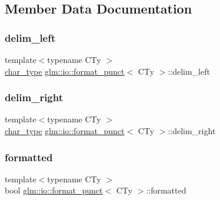 \subsection{Member Data Documentation}
\mbox{\label{classglm_1_1io_1_1format__punct_ab1beed331269a39b06d17d02cf727d7c}} 
\subsubsection{\texorpdfstring{delim\+\_\+left}{delim\_left}}
{\footnotesize\ttfamily template$<$typename C\+Ty $>$ \\
\mbox{\hyperlink{classglm_1_1io_1_1format__punct_ae94c42484a4c5258ad7b2f0f029efdf3}{char\+\_\+type}} \mbox{\hyperlink{classglm_1_1io_1_1format__punct}{glm\+::io\+::format\+\_\+punct}}$<$ C\+Ty $>$\+::delim\+\_\+left}

\mbox{\label{classglm_1_1io_1_1format__punct_a62fb1280404360463ec5af7144aa0949}} 
\subsubsection{\texorpdfstring{delim\+\_\+right}{delim\_right}}
{\footnotesize\ttfamily template$<$typename C\+Ty $>$ \\
\mbox{\hyperlink{classglm_1_1io_1_1format__punct_ae94c42484a4c5258ad7b2f0f029efdf3}{char\+\_\+type}} \mbox{\hyperlink{classglm_1_1io_1_1format__punct}{glm\+::io\+::format\+\_\+punct}}$<$ C\+Ty $>$\+::delim\+\_\+right}

\mbox{\label{classglm_1_1io_1_1format__punct_ab28088e6eef03fe4222fa8a5dd95288e}} 
\subsubsection{\texorpdfstring{formatted}{formatted}}
{\footnotesize\ttfamily template$<$typename C\+Ty $>$ \\
bool \mbox{\hyperlink{classglm_1_1io_1_1format__punct}{glm\+::io\+::format\+\_\+punct}}$<$ C\+Ty $>$\+::formatted}

